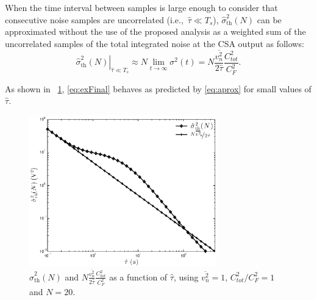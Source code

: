 When the time interval between samples is large enough to consider that consecutive noise samples are uncorrelated \mbox{(i.e., $\hat{\tau} \ll T_s$),} $\hat{\sigma}_\text{th}^2(N)$ can be approximated without the use of the proposed analysis as a weighted sum of the uncorrelated samples of the total integrated noise at the CSA output as follows:
\begin{equation}
	\left. \hat{\sigma}_\text{th}^2(N)\right\rvert_{\hat{\tau}\ll T_s}  \approx  N \lim_{t\rightarrow \infty} \sigma^2(t) = N \frac{\overline{v_n^2}}{2\hat{\tau}}\frac{C_{tot}^2}{C_F^2}. \label{eq:aprox}
\end{equation}

As shown in \figurename~\ref{fig:exampleSigma}, \eqref{eq:exFinal} behaves as predicted by \eqref{eq:aprox} for small values of $\hat{\tau}$.
\begin{figure}[!t]
	\centering
	\includegraphics[width=3.2in]{./Figures/example.eps}
	\caption{$\hat{\sigma}_\text{th}^2(N)$  and $N \frac{\overline{v_n^2}}{2\hat{\tau}}\frac{C_{tot}^2}{C_F^2}$ as a function of $\hat{\tau}$, using $\overline{v_n^2} = 1$, \mbox{$C_{tot}^2/C_F^2 = 1$} and $N = 20$.}\label{fig:exampleSigma}
\end{figure}

